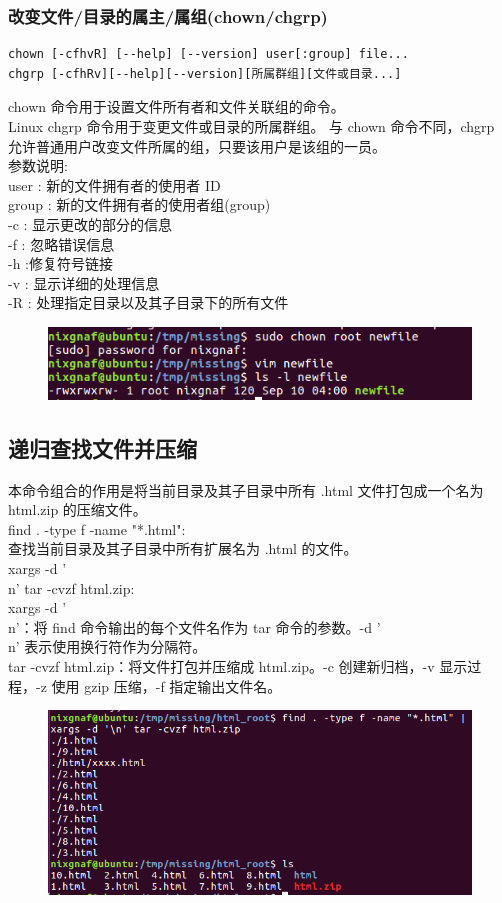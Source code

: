 \documentclass{article}
\begin{document}
\subsubsection{改变文件/目录的属主/属组(chown/chgrp)}
\begin{lstlisting}[style=myStyle]
chown [-cfhvR] [--help] [--version] user[:group] file...
chgrp [-cfhRv][--help][--version][所属群组][文件或目录...]
\end{lstlisting}
chown 命令用于设置文件所有者和文件关联组的命令。\\
Linux chgrp 命令用于变更文件或目录的所属群组。
与 chown 命令不同，chgrp 允许普通用户改变文件所属的组，只要该用户是该组的一员。\\
参数说明:\\
user : 新的文件拥有者的使用者 ID\\
group : 新的文件拥有者的使用者组(group)\\
-c : 显示更改的部分的信息\\
-f : 忽略错误信息\\
-h :修复符号链接\\
-v : 显示详细的处理信息\\
-R : 处理指定目录以及其子目录下的所有文件\\
\begin{figure}[h]
    \centering
    \includegraphics[width=0.5\linewidth]{image22.png}
\end{figure}

\newpage
\subsection{递归查找文件并压缩}
本命令组合的作用是将当前目录及其子目录中所有 .html 文件打包成一个名为 html.zip 的压缩文件。\\
find . -type f -name "*.html":\\
查找当前目录及其子目录中所有扩展名为 .html 的文件。\\
xargs -d '\\n' tar -cvzf html.zip:\\
xargs -d '\\n'：将 find 命令输出的每个文件名作为 tar 命令的参数。-d '\\n' 表示使用换行符作为分隔符。\\
tar -cvzf html.zip：将文件打包并压缩成 html.zip。-c 创建新归档，-v 显示过程，-z 使用 gzip 压缩，-f 指定输出文件名。\\
\begin{figure}[h]
    \centering
    \includegraphics[width=0.5\linewidth]{image23.png}
\end{figure}
\end{document}
